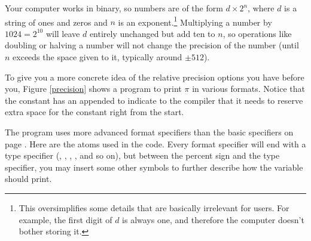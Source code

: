 Your computer works in binary, so numbers are of the form $d \times
2^n$, where $d$ is a string of ones and zeros and $n$ is an
exponent.\footnote{This oversimplifies some details that are
basically irrelevant for users. For example, the first digit of $d$
is always one, and therefore the computer doesn't bother storing it.}
Multiplying a number by $1024=2^{10}$ will leave $d$ entirely unchanged
but add ten to $n$, so operations like doubling or halving a number
will not change the precision of the number (until $n$ exceeds the space
given to it, typically around $\pm 512$).

To give you a more concrete idea of the relative precision options
you have before you, Figure \ref{precision} shows a program to print $\pi$ in various
formats. Notice that the constant has an  appended to indicate
to the compiler that it needs to reserve extra space for the constant
right from the start. 

The program uses more advanced  format specifiers than the basic specifiers
on page \pageref{printf}. Here are the atoms used in the code.  Every
format specifier will end with a type specifier (, , ,
, and so on), but between the percent sign and the type specifier,
you may insert some other symbols to further describe how the variable
should print.

\begin{center}
\label{printftwo}
\end{center}


